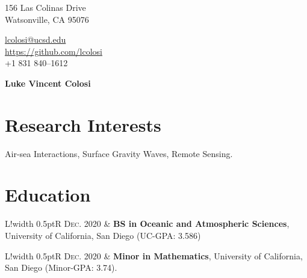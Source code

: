 \documentclass[10pt]{article}
\newcommand\VRule{\color{lightgray}\vrule width 0.5pt}
\begin{document}
\pagestyle{empty}
\begin{minipage}[ht]{0.48\textwidth}
\begin{flushleft}
\small{156 Las Colinas Drive} \\
\small{Watsonville, CA 95076} \\
\end{flushleft}
\end{minipage}
\hfill
\begin{minipage}[ht]{0.48\textwidth}
\begin{flushright}
\noindent \href{mailto:lcolosi@ucsd.edu}{lcolosi@ucsd.edu} \ \ \ \ \ \ \ \ \ \ \ \ \ \ \ \ \ \ \ \   \\
{\url{https://github.com/lcolosi} }\\
\small{+1 831 840--1612} \ \ \ \ \ \ \ \ \ \ \ \ \ \ \ \ \  \ \ \ \ \ \ \     \\
\end{flushright}
\end{minipage}


\vspace{.5cm}
\begin{center}
	{\bfseries\Huge Luke Vincent Colosi}
\end{center}
\vspace{.5cm}

\section*{Research Interests}
\vspace{.3cm}
\hspace{1cm}Air-sea Interactions, Surface Gravity Waves, Remote Sensing.

\section*{Education}
\vspace{.3cm}
\begin{tabular}{L!{\VRule}R}
\textsc{Dec. 2020} & \textbf{BS in Oceanic and Atmospheric Sciences}, University of California, San Diego (UC-GPA: 3.586) \\
\end{tabular}
\newline \noindent
\newline \noindent
\begin{tabular}{L!{\VRule}R}
\textsc{Dec. 2020} & \textbf{Minor in Mathematics}, University of California, San Diego (Minor-GPA: 3.74). \\
\end{tabular}
\end{document}
